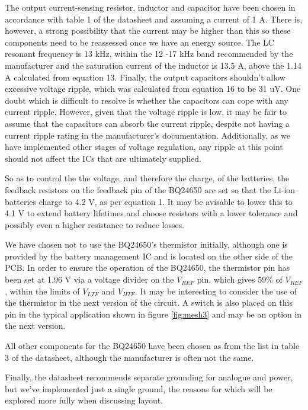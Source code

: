 \documentclass{article}
\begin{document}
The output current-sensing resistor, inductor and capacitor have been chosen in accordance with table 1 of the datasheet and assuming a current of 1 A. There is, however, a strong possibility that the current may be higher than this so these components need to be reassessed once we have an energy source. The LC resonant frequency is 13 kHz, within the 12 -17 kHz band recommended by the manufacturer and the saturation current of the inductor is 13.5 A, above the 1.14 A calculated from equation 13. Finally, the output capacitors shouldn't allow excessive voltage ripple, which was calculated from equation 16 to be 31 uV. One doubt which is difficult to resolve is whether the capacitors can cope with any current ripple. However, given that the voltage ripple is low, it may be fair to assume that the capacitors can absorb the current ripple, despite not having a current ripple rating in the manufacturer's documentation. Additionally, as we have implemented other stages of voltage regulation, any ripple at this point should not affect the ICs that are ultimately supplied. 

So as to control the the voltage, and therefore the charge, of the batteries, the feedback resistors on the feedback pin of the BQ24650 are set so that the Li-ion batteries charge to 4.2 V, as per equation 1. It may be avisable to lower this to 4.1 V to extend battery lifetimes and choose resistors with a lower tolerance and possibly even a higher resistance to reduce losses.

We have chosen not to use the BQ24650's thermistor initially, although one is provided by the battery management IC and is located on the other side of the PCB. In order to ensure the operation of the BQ24650, the thermistor pin has been set at 1.96 V via a voltage divider on the $V_{REF}$ pin, which gives 59\% of  $V_{REF}$, within the limits of $V_{LTF}$ and $V_{HTF}$. It may be interesting to consider the use of the thermistor in the next version of the circuit. A switch is also placed on this pin in the typical application shown in figure \ref{fig:mesh3} and may be an option in the next version.

All other components for the BQ24650 have been chosen as from the list in table 3 of the datasheet, although the manufacturer is often not the same.

Finally, the datasheet recommends separate grounding for analogue and power, but we've implemented just a single ground, the reasons for which will be explored more fully when discussing layout.
\end{document}
